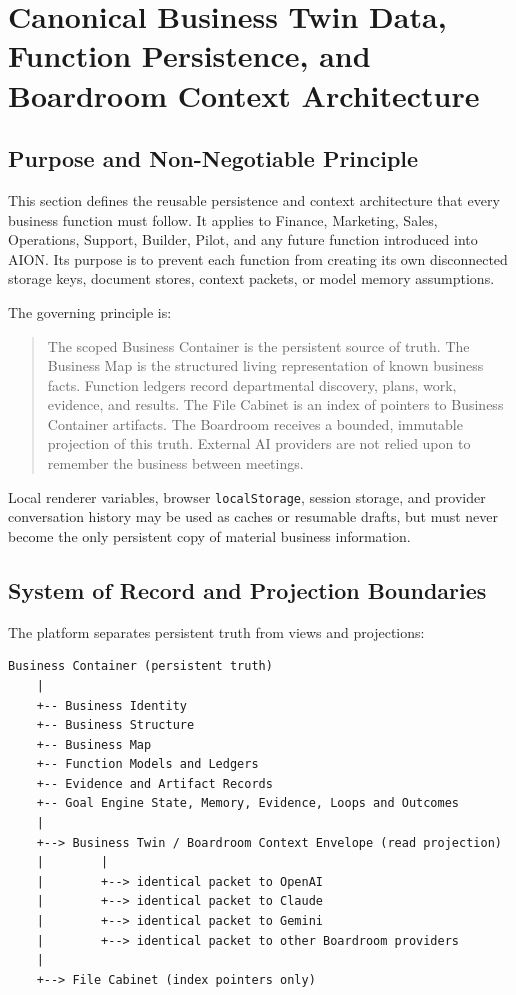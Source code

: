 \section{Canonical Business Twin Data, Function Persistence, and Boardroom Context Architecture}
\label{sec:business-twin-function-persistence}

\subsection{Purpose and Non-Negotiable Principle}

This section defines the reusable persistence and context architecture that every
business function must follow. It applies to Finance, Marketing, Sales,
Operations, Support, Builder, Pilot, and any future function introduced into
AION. Its purpose is to prevent each function from creating its own disconnected
storage keys, document stores, context packets, or model memory assumptions.

The governing principle is:

\begin{quote}
The scoped Business Container is the persistent source of truth. The Business
Map is the structured living representation of known business facts. Function
ledgers record departmental discovery, plans, work, evidence, and results. The
File Cabinet is an index of pointers to Business Container artifacts. The
Boardroom receives a bounded, immutable projection of this truth. External AI
providers are not relied upon to remember the business between meetings.
\end{quote}

Local renderer variables, browser \texttt{localStorage}, session storage, and
provider conversation history may be used as caches or resumable drafts, but
must never become the only persistent copy of material business information.

\subsection{System of Record and Projection Boundaries}

The platform separates persistent truth from views and projections:

\begin{verbatim}
Business Container (persistent truth)
    |
    +-- Business Identity
    +-- Business Structure
    +-- Business Map
    +-- Function Models and Ledgers
    +-- Evidence and Artifact Records
    +-- Goal Engine State, Memory, Evidence, Loops and Outcomes
    |
    +--> Business Twin / Boardroom Context Envelope (read projection)
    |        |
    |        +--> identical packet to OpenAI
    |        +--> identical packet to Claude
    |        +--> identical packet to Gemini
    |        +--> identical packet to other Boardroom providers
    |
    +--> File Cabinet (index pointers only)
\end{verbatim}

